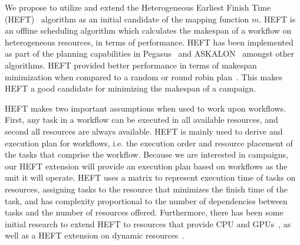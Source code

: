
We propose to utilize and extend the Heterogeneous Earliest Finish Time (HEFT)~\cite{topcuoglu2002performance} algorithm  as an initial candidate of the mapping function $ m $.
HEFT is an offline scheduling algorithm which calculates the makespan of a workflow on heterogeneous resources, in terms of performance.
HEFT has been implemented as part of the planning capabilities in Pegasus~\cite{deelman2015pegasus} and ASKALON~\cite{fahringer2005askalon} amongst other algorithms.
HEFT provided better performance in terms of makespan minimization when compared to a random or round robin plan~\cite{deelman2015pegasus}.
This makes HEFT a good candidate for minimizing the makespan of a campaign.


HEFT makes two important assumptions when used to work upon workflows.
First, any task in a workflow can be executed in all available resources, and second all resources are always available.
HEFT is mainly used to derive and execution plan for workflows, i.e. the execution order and resource placement of the tasks that comprise the workflow.
Because we are interested in campaigns, our HEFT extension will provide an execution plan based on workflows as the unit it will operate.
HEFT uses a matrix to represent execution time of tasks on resources, assigning tasks to the resource that minimizes the finish time of the task, and has complexity proportional to the number of dependencies between tasks and the number of resources offered.
Furthermore, there has been some initial research to extend HEFT to resources that provide CPU and GPUs~\cite{shetti2013optimization}, as well as a HEFT extension on dynamic resources~\cite{dong2007pfas}.

